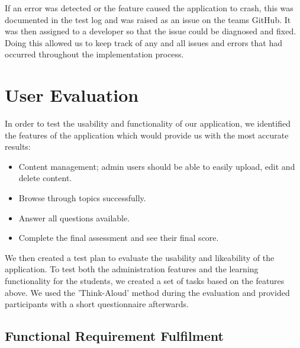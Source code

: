 \documentclass{l3proj}
\begin{document}
If an error was detected or the feature caused the application to
crash, this was documented in the test log and was raised as an issue
on the teams GitHub. It was then assigned to a developer so that the
issue could be diagnosed and fixed. Doing this allowed us to keep
track of any and all issues and errors that had occurred throughout
the implementation process.

% 

\section{User Evaluation}

In order to test the usability and functionality of our application, we identified the features of the application which would provide us with the most accurate results:

\begin{itemize}
\item Content management; admin users should be able to easily upload, edit and delete content.
\item Browse through topics successfully.
\item Answer all questions available.
\item Complete the final assessment and see their final score. 
\end{itemize}

We then created a test plan to evaluate the usability and likeability of the application. To test both the administration features and the learning functionality for the students, we created a set of tasks based on the features above. We used the 'Think-Aloud' method during the evaluation and provided participants with a short questionnaire afterwards.

\subsection{Functional Requirement Fulfilment}

%
\end{document}
